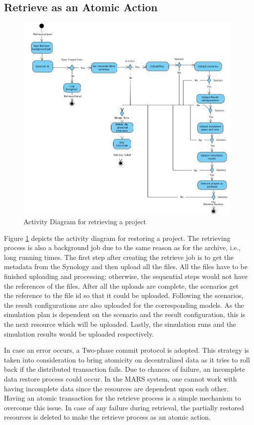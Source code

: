 \subsection{Retrieve as an Atomic Action}
\begin{figure}[H]
    \centering \includegraphics[scale=0.45]{grafiken/restoreActivity.png}
    \caption{Activity Diagram for retrieving a project}
    \label{fig:activityRestore}
\end{figure}

Figure \ref{fig:activityRestore} depicts the activity diagram for restoring a project. The retrieving process is also a background job due to the same reason
as for the archive, i.e., long running times. The first step after creating the retrieve job is to get the metadata from the Synology and then upload all the files.
All the files have to be finished uploading and processing; otherwise, the sequential steps would not have the references of the files. After all the uploads are complete,
the scenarios get the reference to the file id so that it could be uploaded. Following the scenarios, the result configurations are also uploaded for the corresponding models.
As the simulation plan is dependent on the scenario and the result configuration, this is the next resource which will be uploaded. Lastly, the simulation runs
and the simulation results would be uploaded respectively. 

In case an error occurs, a Two-phase commit protocol \cite{atomic} is adopted. This strategy is taken into consideration to bring atomicity on decentralized data
as it tries to roll back if the distributed transaction fails.
Due to chances of failure, an incomplete data restore process could occur. In the MARS system, one cannot work with having
incomplete data since the resources are dependent upon each other. Having an atomic transaction for the retrieve process is a simple mechanism to overcome
this issue. In case of any failure during retrieval, the partially restored resources is deleted to make the retrieve process as an atomic action.

